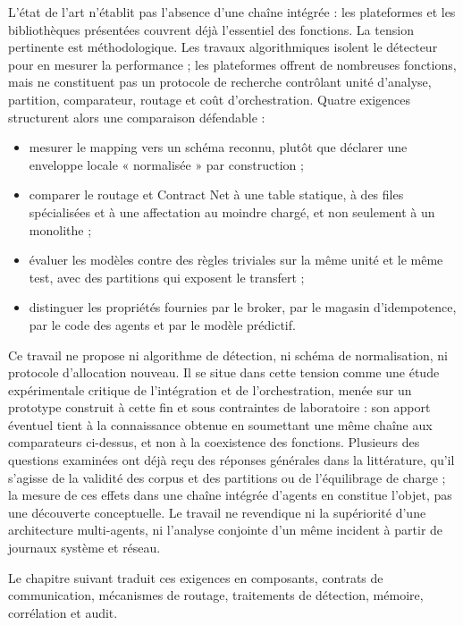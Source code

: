 L'état de l'art n'établit pas l'absence d'une chaîne intégrée : les plateformes et les bibliothèques présentées couvrent déjà l'essentiel des fonctions. La tension pertinente est méthodologique. Les travaux algorithmiques isolent le détecteur pour en mesurer la performance ; les plateformes offrent de nombreuses fonctions, mais ne constituent pas un protocole de recherche contrôlant unité d'analyse, partition, comparateur, routage et coût d'orchestration. Quatre exigences structurent alors une comparaison défendable :
\begin{itemize}
    \item mesurer le mapping vers un schéma reconnu, plutôt que déclarer une enveloppe locale « normalisée » par construction ;
    \item comparer le routage et Contract Net à une table statique, à des files spécialisées et à une affectation au moindre chargé, et non seulement à un monolithe ;
    \item évaluer les modèles contre des règles triviales sur la même unité et le même test, avec des partitions qui exposent le transfert ;
    \item distinguer les propriétés fournies par le broker, par le magasin d'idempotence, par le code des agents et par le modèle prédictif.
\end{itemize}

Ce travail ne propose ni algorithme de détection, ni schéma de normalisation, ni protocole d'allocation nouveau. Il se situe dans cette tension comme une étude expérimentale critique de l'intégration et de l'orchestration, menée sur un prototype construit à cette fin et sous contraintes de laboratoire : son apport éventuel tient à la connaissance obtenue en soumettant une même chaîne aux comparateurs ci-dessus, et non à la coexistence des fonctions. Plusieurs des questions examinées ont déjà reçu des réponses générales dans la littérature, qu'il s'agisse de la validité des corpus et des partitions \cite{sommer2010outside,arp2022dos,le2022logbased,engelen2021troubleshooting,liu2022error} ou de l'équilibrage de charge \cite{mitzenmacher2001power,mitzenmacher2000old} ; la mesure de ces effets dans une chaîne intégrée d'agents en constitue l'objet, pas une découverte conceptuelle. Le travail ne revendique ni la supériorité d'une architecture multi-agents, ni l'analyse conjointe d'un même incident à partir de journaux système et réseau.

Le chapitre suivant traduit ces exigences en composants, contrats de communication, mécanismes de routage, traitements de détection, mémoire, corrélation et audit.
